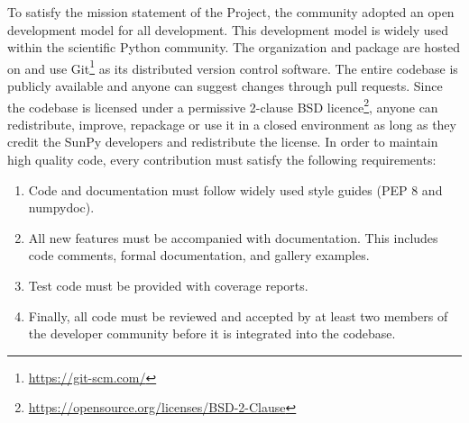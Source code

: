 To satisfy the mission statement of the Project, the \sunpy community adopted an open development model for all development. 
This development model is widely used within the scientific Python community. 
The \sunpy organization and \sunpypkg package are hosted on \github and use Git\footnote{\url{https://git-scm.com/}} as its distributed version control software.
The entire codebase is publicly available and anyone can suggest changes through pull requests. 
Since the codebase is licensed under a permissive 2-clause BSD licence\footnote{\url{https://opensource.org/licenses/BSD-2-Clause}}, anyone can redistribute, improve, repackage or use it in a closed environment as long as they credit the SunPy developers and redistribute the license. 
In order to maintain high quality code, every contribution must satisfy the following requirements:
\begin{enumerate}
    \item Code and documentation must follow widely used style guides (PEP 8 and numpydoc).
    \item All new features must be accompanied with documentation. 
    This includes code comments, formal documentation, and gallery examples.
    \item Test code must be provided with coverage reports.
    \item Finally, all code must be reviewed and accepted by at least two members of the developer community before it is integrated into the codebase.
\end{enumerate}

